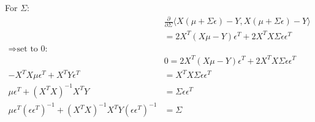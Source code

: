 \documentclass[a4paper]{scrartcl}
\begin{document}
    
    For $\Sigma$:
    \begin{align*}
      &\frac{\partial}{\partial \Sigma}\langle X (\mu + \Sigma \epsilon) - Y, X (\mu + \Sigma \epsilon) -Y \rangle\\
      &= 2X^T(X \mu  - Y) \epsilon^T + 2 X^T X \Sigma \epsilon \epsilon^T\\
      \Rightarrow \text{set to 0:}\\
      &0 = 2X^T(X \mu  - Y) \epsilon^T + 2 X^T X \Sigma \epsilon \epsilon^T\\
      - X^T X \mu \epsilon^T +  X^T Y \epsilon^T &= X^T X \Sigma \epsilon \epsilon^T\\
      \mu \epsilon^T + (X^T X)^{-1} X^T Y &= \Sigma \epsilon \epsilon^T\\
      \mu \epsilon^T (\epsilon \epsilon^T)^{-1} + (X^T X)^{-1} X^T Y (\epsilon \epsilon^T)^{-1}&= \Sigma\\
    \end{align*}
\end{document}
